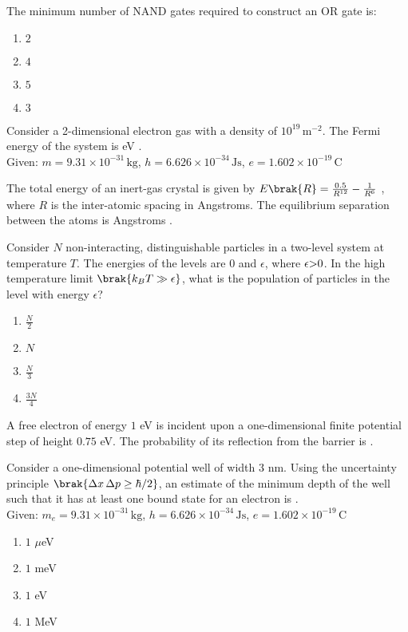     \item 
    The minimum number of NAND gates required to construct an OR gate is:
    \begin{enumerate}
        \item $2$
        \item $4$
        \item $5$
        \item $3$
    \end{enumerate}
  
    \item 
    Consider a 2-dimensional electron gas with a density of $10^{19} \, \text{m}^{-2}$. The Fermi energy of the system is  eV . \\
    Given: $m = 9.31 \times 10^{-31} \, \text{kg}$, $h = 6.626 \times 10^{-34} \, \text{Js}$, $e = 1.602 \times 10^{-19} \, \text{C}$
    
    \item
    The total energy of an inert-gas crystal is given by $E\brak{R} = \frac{0.5}{R^{12}} - \frac{1}{R^6}$ , where $R$ is the inter-atomic spacing in Angstroms. The equilibrium separation between the atoms is Angstroms .
    
    \item 
    Consider $N$ non-interacting, distinguishable particles in a two-level system at temperature $T$. The energies of the levels are $0$ and $\epsilon$, where $\epsilon \text{\textgreater} 0$. In the high temperature limit $\brak{k_B T \gg \epsilon}$, what is the population of particles in the level with energy $\epsilon$?
    \begin{enumerate}
        \item $\frac{N}{2}$
        \item $N$
        \item $\frac{N}{3}$
        \item $\frac{3N}{4}$
    \end{enumerate}
    
    \item 
    A free electron of energy $1$ eV is incident upon a one-dimensional finite potential step of height $0.75$ eV. The probability of its reflection from the barrier is .

    \item 
    Consider a one-dimensional potential well of width $3$ nm. Using the uncertainty principle $\brak{\Delta x \, \Delta p \geq \hbar/2}$, an estimate of the minimum depth of the well such that it has at least one bound state for an electron is . \\
    Given: $m_e = 9.31 \times 10^{-31} \, \text{kg}$, $h = 6.626 \times 10^{-34} \, \text{Js}$, $e = 1.602 \times 10^{-19} \, \text{C}$
    \begin{enumerate}
        \item $1$ $\mu$eV
        \item $1$ meV
        \item $1$ eV
        \item $1$ MeV
    \end{enumerate}
    
